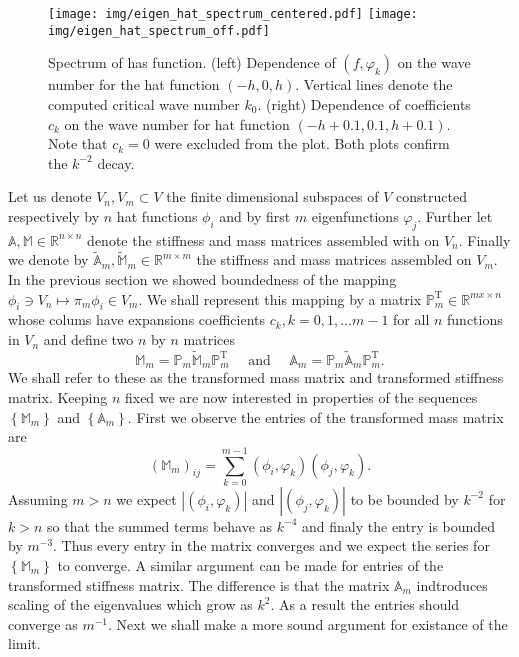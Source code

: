 \documentclass[a4paper,10pt]{article}
\newcommand{\R}{\ensuremath{\mathbb{R}}}
\newcommand{\inner}[2]{\ensuremath{\left(#1, #2\right)}}
\newcommand{\Amat}{\ensuremath{\mathbb{A}}}
\newcommand{\Mmat}{\ensuremath{\mathbb{M}}}
\newcommand{\Ammatt}{\ensuremath{\tilde{\mathbb{A}}_m}}              %
\newcommand{\Mmmatt}{\ensuremath{\tilde{\mathbb{M}}_m}}              %
\newcommand{\Ammat}{\ensuremath{\mathbb{A}_m}}               %
\newcommand{\Mmmat}{\ensuremath{\mathbb{M}_m}}               %
\newcommand{\Pmat}{\ensuremath{\mathbb{P}_m}}                  %
\newcommand{\Pmatt}{\ensuremath{\mathbb{P}_m^{\text{T}}}}       %
\begin{document}
  \begin{figure}
  \begin{center}
    \texttt{[image: img/eigen\_hat\_spectrum\_centered.pdf]}
    \texttt{[image: img/eigen\_hat\_spectrum\_off.pdf]}
  \end{center}
  \label{fig:eig_hat_spectrum}
  \caption{Spectrum of has function. (left) Dependence of $\inner{f}{\varphi_k}$
    on the wave number for the hat function $(-h, 0, h)$. Vertical lines denote
    the computed critical wave number $k_0$. (right) Dependence of coefficients
    $c_k$ on the wave number for hat function $(-h+0.1, 0.1, h+0.1)$. Note that
    $c_k=0$ were excluded from the plot. Both plots confirm the $k^{-2}$ decay.}
  \end{figure}

  Let us denote $V_n, V_m\subset V$ the finite dimensional subspaces of $V$
  constructed respectively by $n$ hat functions $\phi_i$ and by first $m$
  eigenfunctions $\varphi_j$. Further let $\Amat, \Mmat \in \R^{n \times n}$ denote
  the stiffness and mass matrices assembled with on $V_n$. Finally we denote
  by $\Ammatt, \Mmmatt \in \R^{m\times m}$ the stiffness and mass matrices
  assembled on $V_m$. In the previous section we showed boundedness of the
  mapping $\phi_i\ni V_n \mapsto \pi_m\phi_i \in V_m$.
  We shall represent this mapping by a matrix $\Pmatt\in\R^{m x\times n}$ whose
  colums have expansions coefficients $c_k, k=0,1, \dots m-1$ for all $n$
  functions in $V_n$ and define two $n$ by $n$ matrices
  \[
    \Mmmat = \Pmat\Mmmatt\Pmatt
    \quad{\text{ and }}\quad
    \Ammat = \Pmat\Ammatt\Pmatt.
  \]
  We shall refer to these as the transformed mass matrix and transformed
  stiffness matrix. Keeping $n$ fixed we are now interested in properties of
  the sequences $\left\{\Mmmat\right\}$ and $\left\{\Ammat\right\}$. First we
  observe the entries of the transformed mass matrix are
  \[
    \left(\Mmmat\right)_{ij} =
    \displaystyle\sum\limits_{k=0}^{m-1}
    \inner{\phi_i}{\varphi_k}\inner{\phi_j}{\varphi_k}.
  \]
  Assuming $m>n$ we expect $\left| \inner{\phi_i}{\varphi_k} \right|$ and
  $\left| \inner{\phi_j}{\varphi_k} \right|$ to be bounded by $k^{-2}$ for 
  $k>n$ so that the summed terms behave as $k^{-4}$ and finaly the entry
  is bounded by $m^{-3}$. Thus every entry in the matrix converges and we expect
  the series for $\left\{\Mmmat\right\}$ to converge. A similar argument can
  be made for entries of the transformed stiffness matrix. The difference is
  that the matrix $\Ammat$ indtroduces scaling of the eigenvalues which grow
  as $k^2$. As a result the entries should converge as $m^{-1}$. Next we shall
  make a more sound argument for existance of the limit.
\end{document}
